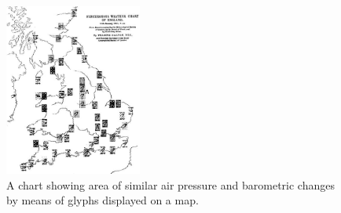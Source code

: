 \begin{figure}[!htb]
\centering
\includegraphics[width=0.4\textwidth,keepaspectratio]{images/history/weather.jpg}
\caption[
    A chart showing area of similar air pressure and barometric changes by means of glyphs displayed on a map., Urldate: 07.2016 \newline
\small\texttt{\url{http://datavis.ca/milestones//admin/uploads/images/galton-weather-charts2.gif}}
]{A chart showing area of similar air pressure and barometric changes by means of glyphs displayed on a map.}
\label{fig:weather-map}
\end{figure}

